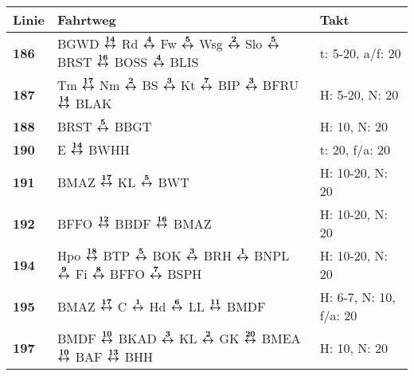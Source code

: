 \begin{minipage}[t]{0.05\textwidth}
\phantom{Tor}
\end{minipage}
\begin{minipage}[t]{0.45\textwidth}
\begin{tabular}{>{\bfseries}L{1.2cm}L{9.0cm}L{3.0cm}}
{\bfseries Linie} & {\bfseries Fahrtweg} & {\bfseries Takt} \\
\hline
\bus{} 186    & BGWD $\xarwe{14}$ Rd $\xarwe{4}$ Fw $\xarwe{5}$ Wsg $\xarwe{2}$ Slo $\xarwe{5}$ BRST $\xarwe{16}$ BOSS $\xarwe{4}$ BLIS                                             & t: 5-20, a/f: 20           \\
\bus{} 187    & Tm $\xarwe{17}$ Nm $\xarwe{2}$ BS $\xarwe{3}$ Kt $\xarwe{7}$ BIP $\xarwe{3}$ BFRU $\xarwe{14}$ BLAK                                                                 & H: 5-20, N: 20             \\
\bus{} 188    & BRST $\xarwe{5}$ BBGT                                                                                                                                               & H: 10, N: 20               \\
\bus{} 190    & E $\xarwe{14}$ BWHH                                                                                                                                                 & t: 20, f/a: 20             \\
\bus{} 191    & BMAZ $\xarwe{17}$ KL $\xarwe{5}$ BWT                                                                                                                                & H: 10-20, N: 20            \\
\bus{} 192    & BFFO $\xarwe{12}$ BBDF $\xarwe{16}$ BMAZ                                                                                                                            & H: 10-20, N: 20            \\
\bus{} 194    & Hpo $\xarwe{18}$ BTP $\xarwe{5}$ BOK $\xarwe{3}$ BRH $\xarwe{1}$ BNPL $\xarwe{9}$ Fi $\xarwe{8}$ BFFO $\xarwe{7}$ BSPH                                              & H: 10-20, N: 20            \\
\bus{} 195    & BMAZ $\xarwe{17}$ C $\xarwe{1}$ Hd $\xarwe{6}$ LL $\xarwe{11}$ BMDF                                                                                                 & H: 6-7, N: 10, f/a: 20     \\
\bus{} 197    & BMDF $\xarwe{10}$ BKAD $\xarwe{3}$ KL $\xarwe{2}$ GK $\xarwe{20}$ BMEA $\xarwe{10}$ BAF $\xarwe{13}$ BHH                                                            & H: 10, N: 20               \\

\end{tabular}
\end{minipage}
